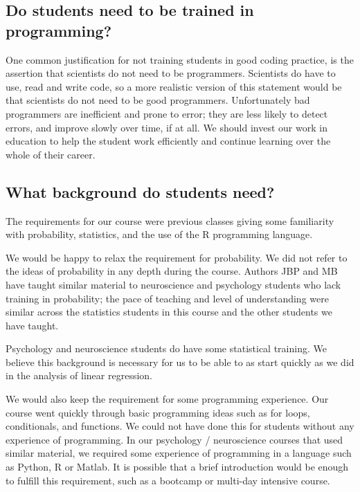 
\subsection{Do students need to be trained in programming?}

One common justification for not training students in good coding practice, is
the assertion that scientists do not need to be programmers.  Scientists do
have to use, read and write code, so a more realistic version of this
statement would be that scientists do not need to be good programmers.
Unfortunately bad programmers are inefficient and prone to error; they are
less likely to detect errors, and improve slowly over time, if at all.  We
should invest our work in education to help the student work efficiently and
continue learning over the whole of their career.

\subsection{What background do students need?}

The requirements for our course were previous classes giving some familiarity
with probability, statistics, and the use of the R programming language.

We would be happy to relax the requirement for probability.  We did not refer
to the ideas of probability in any depth during the course.  Authors JBP and
MB have taught similar material to neuroscience and psychology students who
lack training in probability; the pace of teaching and level of understanding
were similar across the statistics students in this course and the other
students we have taught.

Psychology and neuroscience students do have some statistical training.  We
believe this background is necessary for us to be able to as start quickly as
we did in the analysis of linear regression.

We would also keep the requirement for some programming experience.  Our
course went quickly through basic programming ideas such as for loops,
conditionals, and functions.  We could not have done this for students without
any experience of programming.  In our psychology / neuroscience courses that
used similar material, we required some experience of programming in a
language such as Python, R or Matlab.  It is possible that a brief
introduction would be enough to fulfill this requirement, such as a bootcamp
or multi-day intensive course.

